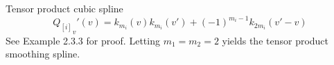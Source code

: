\begin{example}{Tensor product cubic spline}
\begin{equation}
{Q_{\left[i\right]} }_v'\left(v\right) = k_{m_i}\left(v\right)k_{m_i}\left(v'\right) + \left(-1\right)^{m_i-1}k_{2m_i}\left(v' - v\right)
\end{equation}
\noindent
See \citet{gu2002smoothing} Example 2.3.3 for proof. Letting $m_1 = m_2 = 2$ yields the tensor product smoothing spline. 









\end{example}





